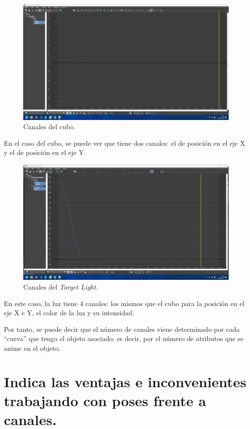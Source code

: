\documentclass[draft]{article}
\begin{document}
\begin{figure}[H]
    \centering
    \includegraphics[width=\textwidth]{imagenes/11.png}
    \caption{Canales del cubo.}
\end{figure}

En el caso del cubo, se puede ver que tiene dos canales: el de posición en el eje X y el de posición en el eje Y.

\begin{figure}[H]
    \centering
    \includegraphics[width=\textwidth]{imagenes/12.png}
    \caption{Canales del \textit{Target Light}.}
\end{figure}

En este caso, la luz tiene 4 canales: los mismos que el cubo para la posición en el eje X e Y, el color de la luz y su intensidad.

\bigskip

Por tanto, se puede decir que el número de canales viene determinado por cada ``curva'' que tenga el objeto asociado; es decir, por el número de atributos que se anime en el objeto.


\section{Indica las ventajas e inconvenientes trabajando con poses frente a canales.}
\end{document}
